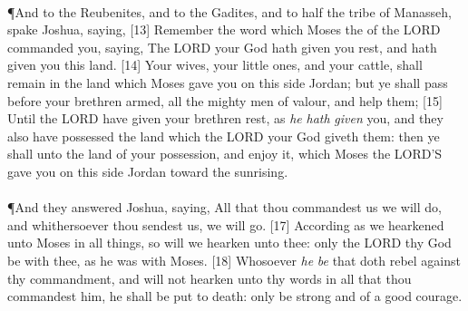 \\
\P \textcolor[cmyk]{0.99998,1,0,0}{And to the Reubenites, and to the Gadites, and to half the tribe of Manasseh, spake Joshua, saying,}
[13] \textcolor[cmyk]{0.99998,1,0,0}{Remember the word which Moses the  of the LORD commanded you, saying, The LORD your God hath given you rest, and hath given you this land.}
[14] \textcolor[cmyk]{0.99998,1,0,0}{Your wives, your little ones, and your cattle, shall remain in the land which Moses gave you on this side Jordan; but ye shall pass before your brethren armed, all the mighty men of valour, and help them;}
[15] \textcolor[cmyk]{0.99998,1,0,0}{Until the LORD have given your brethren rest, as \emph{he} \emph{hath} \emph{given} you, and they also have possessed the land which the LORD your God giveth them: then ye shall  unto the land of your possession, and enjoy it, which Moses the LORD'S  gave you on this side Jordan toward the sunrising.}\\
\\
\P \textcolor[cmyk]{0.99998,1,0,0}{And they answered Joshua, saying, All that thou commandest us we will do, and whithersoever thou sendest us, we will go.}
[17] \textcolor[cmyk]{0.99998,1,0,0}{According as we hearkened unto Moses in all things, so will we hearken unto thee: only the LORD thy God be with thee, as he was with Moses.}
[18] \textcolor[cmyk]{0.99998,1,0,0}{Whosoever \emph{he} \emph{be} that doth rebel against thy commandment, and will not hearken unto thy words in all that thou commandest him, he shall be put to death: only be strong and of a good courage.}

